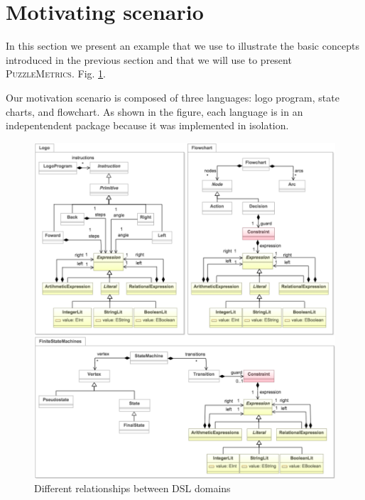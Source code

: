 \section{Motivating scenario}
\label{sec:example}

In this section we present an example that we use to illustrate the basic concepts introduced in the previous section and that we will use to present \textsc{PuzzleMetrics}. Fig. \ref{fig:motivating-example}.

Our motivation scenario is composed of three languages: logo program, state charts, and flowchart. As shown in the figure, each language is in an indepentendent package because it was implemented in isolation. 

\begin{figure}
\centering
\includegraphics[width=1.05\linewidth]{images/motivating-example.pdf}
\caption{Different relationships between DSL domains}
\label{fig:motivating-example}
\end{figure}